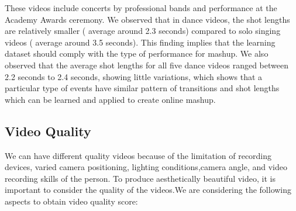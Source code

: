 \documentclass{sig-alternate}
\begin{document}
These videos include concerts by professional bands and performance at the Academy Awards ceremony. We observed that in dance videos, the shot lengths are relatively smaller ( average around 2.3 seconds) compared to solo singing videos ( average around 3.5 seconds). This finding implies that the learning dataset should comply with the type of performance for mashup. We also observed that the average shot lengths for all five dance videos ranged between 2.2 seconds to 2.4 seconds, showing little variations, which shows that a particular type of events have similar pattern of transitions and shot lengths which can be learned and applied to create online mashup.


\subsection{Video Quality}
We can have different quality videos because of the limitation of recording devices, varied camera positioning, lighting conditions,camera angle, and video recording skills of the person. To produce aesthetically beautiful video, it is important to consider the quality of the videos.We are considering the following aspects to obtain video quality score:
\end{document}
